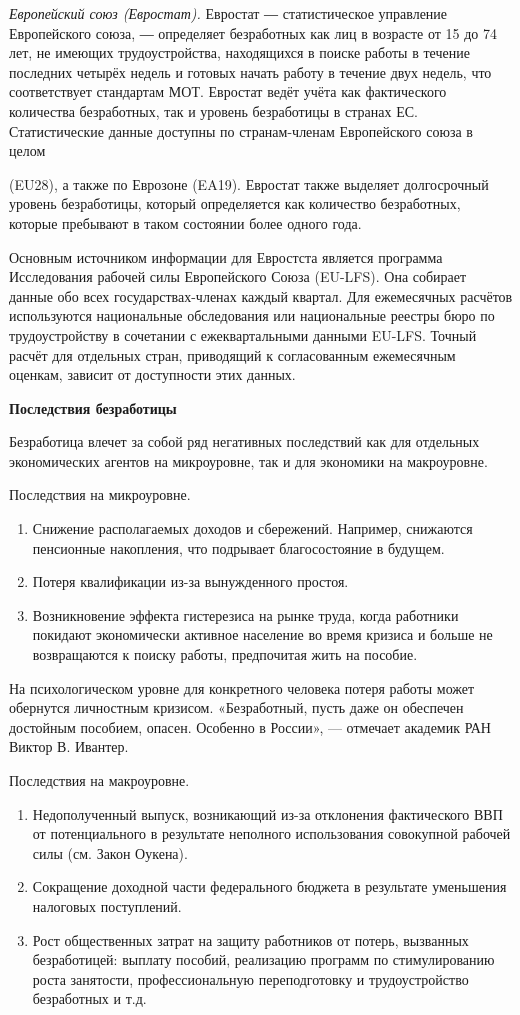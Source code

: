 \textit{Европейский союз (Евростат).}
Евростат ― статистическое управление Европейского союза, ― определяет безработных как лиц в возрасте от 15 до 74 лет, не имеющих трудоустройства, находящихся в поиске работы в течение последних четырёх недель и готовых начать работу в течение двух недель, что соответствует стандартам МОТ. Евростат ведёт учёта как фактического количества безработных, так и уровень безработицы в странах ЕС. Статистические данные доступны по странам-членам Европейского союза в целом

(EU28), а также по Еврозоне (EA19). Евростат также выделяет долгосрочный уровень безработицы, который определяется как количество безработных, которые пребывают в таком состоянии более одного года.

Основным источником информации для Евростста является программа Исследования рабочей силы Европейского Союза (EU-LFS). Она собирает данные обо всех государствах-членах каждый квартал. Для ежемесячных расчётов используются национальные обследования или национальные реестры бюро по трудоустройству в сочетании с ежеквартальными данными EU-LFS. Точный расчёт для отдельных стран, приводящий к согласованным ежемесячным оценкам, зависит от доступности этих данных.

\textbf{Последствия безработицы}

Безработица влечет за собой ряд негативных последствий как для отдельных экономических агентов на микроуровне, так и для экономики на макроуровне.

Последствия на микроуровне.
\begin{enumerate}
    \item Снижение располагаемых доходов и сбережений. Например, снижаются пенсионные накопления, что подрывает благосостояние в будущем.
    \item Потеря квалификации из-за вынужденного простоя.
    \item Возникновение эффекта гистерезиса на рынке труда, когда работники покидают экономически активное население во время кризиса и больше не возвращаются к поиску работы, предпочитая жить на пособие.
\end{enumerate}
На психологическом уровне для конкретного человека потеря работы может обернутся личностным кризисом. «Безработный, пусть даже он обеспечен достойным пособием, опасен. Особенно в России», — отмечает академик РАН Виктор В. Ивантер.

Последствия на макроуровне.
\begin{enumerate}
    \item Недополученный выпуск, возникающий из-за отклонения фактического ВВП от потенциального в результате неполного использования совокупной рабочей силы (см. Закон Оукена).
    \item Сокращение доходной части федерального бюджета в результате уменьшения налоговых поступлений.
    \item Рост общественных затрат на защиту работников от потерь, вызванных безработицей: выплату пособий, реализацию программ по стимулированию роста занятости, профессиональную переподготовку и трудоустройство безработных и т.д.
\end{enumerate}

